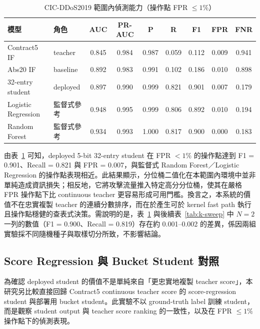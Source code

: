 \documentclass[12pt, a4paper, fontset=none]{ctexart}
\begin{document}
\begin{table}[H]
  \centering
  \caption{CIC-DDoS2019 範圍內偵測能力（操作點 FPR $\leq 1\%$）}
  \label{tab:main-results}
  \small
  \renewcommand{\arraystretch}{1.15}
  \setlength{\tabcolsep}{3.5pt}
  \begin{tabular}{l l c c c c c c c}
    \toprule
    \textbf{模型} & \textbf{角色} & AUC & PR-AUC & P & R & F1 & FPR & FNR \\
    \midrule
    Contract5 IF & teacher & 0.845 & 0.984 & 0.987 & 0.059 & 0.112 & 0.009 & 0.941 \\
    Abs20 IF & baseline & 0.892 & 0.983 & 0.991 & 0.102 & 0.186 & 0.010 & 0.898 \\
    32-entry student & deployed & 0.897 & 0.990 & 0.999 & 0.821 & 0.901 & 0.007 & 0.179 \\
    Logistic Regression & 監督式參考 & 0.948 & 0.995 & 0.999 & 0.806 & 0.892 & 0.010 & 0.194 \\
    Random Forest & 監督式參考 & 0.934 & 0.993 & 1.000 & 0.817 & 0.900 & 0.000 & 0.183 \\
    \bottomrule
  \end{tabular}
\end{table}

由表~\ref{tab:main-results} 可知，deployed 5-bit 32-entry student 在 FPR $<1\%$ 的操作點達到 F1 = 0.901、Recall = 0.821 與 FPR = 0.007，與監督式 Random Forest／Logistic Regression 的操作點表現相近。此結果顯示，分位桶二值化在本範圍內環境中並非單純造成資訊損失；相反地，它將攻擊流量推入特定高分分位桶，使其在嚴格 FPR 操作點下比 continuous teacher 更容易形成可用門檻。換言之，本系統的價值不在忠實複製 teacher 的連續分數排序，而在於產生可於 kernel fast path 執行且操作點穩健的查表式決策。需說明的是，表~\ref{tab:main-results} 與後續表~\ref{tab:k-sweep} 中 $N=2$ 一列的數值（F1 = 0.900、Recall = 0.819）存在約 0.001--0.002 的差異，係因兩組實驗採不同隨機種子與取樣切分所致，不影響結論。

\subsection{Score Regression 與 Bucket Student 對照}
為確認 deployed student 的價值不是單純來自「更忠實地複製 teacher score」，本研究另比較直接回歸 Contract5 continuous teacher score 的 score-regression student 與部署用 bucket student。此實驗不以 ground-truth label 訓練 student，而是觀察 student output 與 teacher score ranking 的一致性，以及在 FPR $\leq 1\%$ 操作點下的偵測表現。
\end{document}
